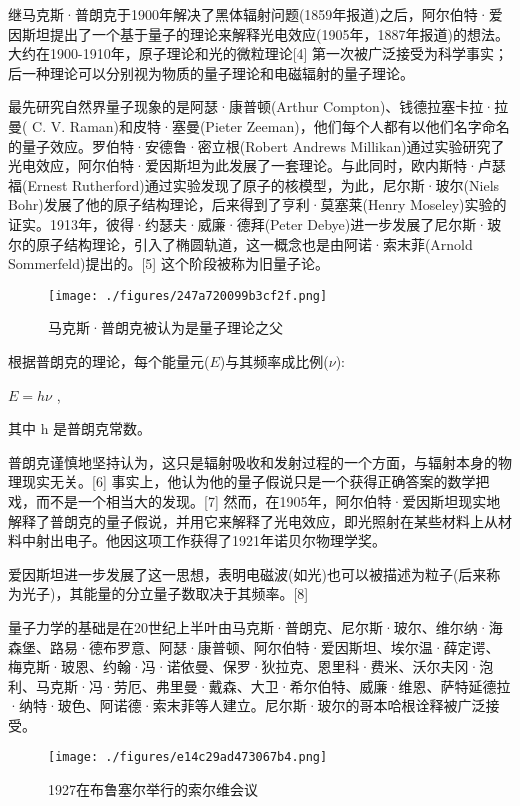 继马克斯·普朗克于1900年解决了黑体辐射问题(1859年报道)之后，阿尔伯特·爱因斯坦提出了一个基于量子的理论来解释光电效应(1905年，1887年报道)的想法。 大约在1900-1910年，原子理论和光的微粒理论[4] 第一次被广泛接受为科学事实；后一种理论可以分别视为物质的量子理论和电磁辐射的量子理论。

最先研究自然界量子现象的是阿瑟·康普顿(Arthur Compton)、钱德拉塞卡拉·拉曼( C. V. Raman)和皮特·塞曼(Pieter Zeeman)，他们每个人都有以他们名字命名的量子效应。罗伯特·安德鲁·密立根(Robert Andrews Millikan)通过实验研究了光电效应，阿尔伯特·爱因斯坦为此发展了一套理论。与此同时，欧内斯特·卢瑟福(Ernest Rutherford)通过实验发现了原子的核模型，为此，尼尔斯·玻尔(Niels Bohr)发展了他的原子结构理论，后来得到了亨利·莫塞莱(Henry Moseley)实验的证实。1913年，彼得·约瑟夫·威廉·德拜(Peter Debye)进一步发展了尼尔斯·玻尔的原子结构理论，引入了椭圆轨道，这一概念也是由阿诺·索末菲(Arnold Sommerfeld)提出的。[5] 这个阶段被称为旧量子论。

\begin{figure}[ht]
\centering
\texttt{[image: ./figures/247a720099b3cf2f.png]}
\caption{马克斯·普朗克被认为是量子理论之父} \label{fig_LZLX_1}
\end{figure}
根据普朗克的理论，每个能量元($E$)与其频率成比例($\nu$):

$E = h\nu$ ,

其中 h 是普朗克常数。

普朗克谨慎地坚持认为，这只是辐射吸收和发射过程的一个方面，与辐射本身的物理现实无关。[6] 事实上，他认为他的量子假说只是一个获得正确答案的数学把戏，而不是一个相当大的发现。[7] 然而，在1905年，阿尔伯特·爱因斯坦现实地解释了普朗克的量子假说，并用它来解释了光电效应，即光照射在某些材料上从材料中射出电子。他因这项工作获得了1921年诺贝尔物理学奖。

爱因斯坦进一步发展了这一思想，表明电磁波(如光)也可以被描述为粒子(后来称为光子)，其能量的分立量子数取决于其频率。[8]

量子力学的基础是在20世纪上半叶由马克斯·普朗克、尼尔斯·玻尔、维尔纳·海森堡、路易·德布罗意、阿瑟·康普顿、阿尔伯特·爱因斯坦、埃尔温·薛定谔、梅克斯·玻恩、约翰·冯·诺依曼、保罗·狄拉克、恩里科·费米、沃尔夫冈·泡利、马克斯·冯·劳厄、弗里曼·戴森、大卫·希尔伯特、威廉·维恩、萨特延德拉·纳特·玻色、阿诺德·索末菲等人建立。尼尔斯·玻尔的哥本哈根诠释被广泛接受。

\begin{figure}[ht]
\centering
\texttt{[image: ./figures/e14c29ad473067b4.png]}
\caption{1927在布鲁塞尔举行的索尔维会议} \label{fig_LZLX_2}
\end{figure}

